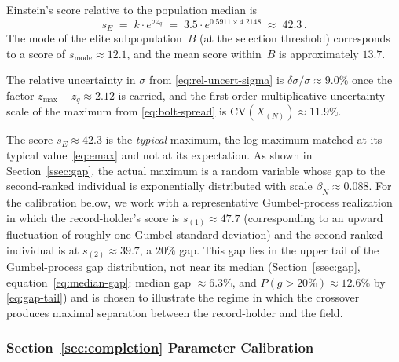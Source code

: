 \documentclass{article}
\begin{document}
Einstein's score relative to the population median is
\begin{equation}\label{eq:einstein-score}
  s_E
  \;=\;
  k \cdot e^{\sigma z_q}
  \;=\;
  3.5 \cdot e^{0.5911 \times 4.2148}
  \;\approx\; 42.3\,.
\end{equation}
The mode of the elite subpopulation~$B$ (at the selection threshold)
corresponds to a score of $s_{\mathrm{mode}} \approx 12.1$, and the
mean score within~$B$ is approximately $13.7$.

The relative uncertainty in $\sigma$ from \eqref{eq:rel-uncert-sigma} is $\delta\sigma/\sigma \approx 9.0\%$ once the factor $z_{\max} - z_q \approx 2.12$ is carried, and the first-order multiplicative uncertainty scale of the maximum from \eqref{eq:bolt-spread} is
$\mathrm{CV}(X_{(N)}) \approx 11.9\%$.

The score $s_E \approx 42.3$ is the \emph{typical} maximum, the log-maximum matched at its typical value~\eqref{eq:emax} and not at its expectation. As shown in
Section~\ref{ssec:gap}, the actual maximum is a random variable whose gap
to the second-ranked individual is exponentially distributed with scale
$\beta_N \approx 0.088$. For the calibration below, we work with a
representative Gumbel-process realization in which the record-holder's
score is $s_{(1)} \approx 47.7$ (corresponding to an upward fluctuation
of roughly one Gumbel standard deviation) and the second-ranked
individual is at $s_{(2)} \approx 39.7$, a $20\%$ gap. This gap lies
in the upper tail of the Gumbel-process gap distribution, not near its median
(Section~\ref{ssec:gap}, equation~\eqref{eq:median-gap}: median gap
$\approx 6.3\%$, and $P(g > 20\%) \approx 12.6\%$ by \eqref{eq:gap-tail}) and is chosen to illustrate the regime in which
the crossover produces maximal separation between the
record-holder and the field.

\subsubsection{Section~\ref{sec:completion} Parameter Calibration}
\end{document}
